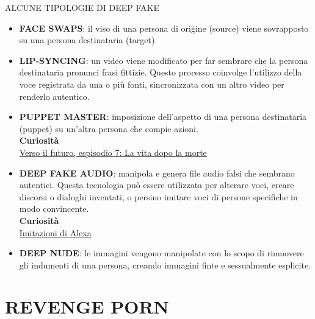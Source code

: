 \documentclass[aspectratio=1610]{beamer}
\begin{document}
\begin{frame}{ALCUNE TIPOLOGIE DI DEEP FAKE}
    \begin{itemize}
        \justifying
        \item \textbf{FACE SWAPS}: il viso di una persona di origine (source) viene 
        sovrapposto su una persona destinataria (target).
        \pause
        \item \textbf{LIP-SYNCING}: un video viene modificato per far sembrare che la persona 
        destinataria pronunci frasi fittizie. Questo processo coinvolge l’utilizzo della voce 
        registrata da una o più fonti, sincronizzata con un altro video per renderlo autentico. 
        \pause
        \item \textbf{PUPPET MASTER}: imposizione dell’aspetto di una persona destinataria (puppet) 
        su un’altra persona che compie azioni.\\
        \tiny{\textbf{Curiosità}}\\
        \tiny{\href{https://www.netflix.com/it/title/81123425}{Verso il futuro, espisodio 7: La vita dopo la morte}}\\
        \pause
        \normalsize
        \item \textbf{DEEP FAKE AUDIO}: manipola e genera file audio falsi che sembrano autentici. 
        Questa tecnologia può essere utilizzata per alterare voci, creare discorsi o dialoghi inventati, 
        o persino imitare voci di persone specifiche in modo convincente.\\
        \tiny{\textbf{Curiosità}}\\
        \tiny{\href{https://www.wired.it/article/alexa-imita-voci-morti}{Imitazioni di Alexa}}\\
        \pause
        \normalsize
        \item \textbf{DEEP NUDE}: le immagini vengono manipolate con lo scopo di rimuovere 
        gli indumenti di una persona, creando immagini finte e sessualmente esplicite.
    \end{itemize}
\end{frame}

\section{REVENGE PORN}
\end{document}
